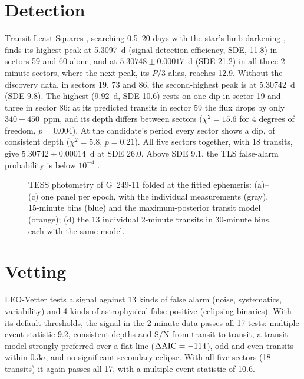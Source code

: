 \documentclass{aastex701}
\begin{document}
\section{Detection}

Transit Least Squares \citep[TLS;][]{Hippke2019tls}, searching 0.5--20 days with the
star's limb darkening \citep{Claret2017}, finds its highest peak at 5.3097~d (signal
detection efficiency, SDE, 11.8) in sectors 59 and 60 alone, and at
$5.30748\pm0.00017$~d (SDE 21.2) in all three 2-minute sectors, where the next peak, its
$P/3$ alias, reaches 12.9. Without the discovery data, in sectors 19, 73 and 86, the
second-highest peak is at 5.30742~d (SDE 9.8). The highest (9.92~d, SDE 10.6) rests on
one dip in sector 19 and three in sector 86: at its predicted transits in sector 59 the
flux drops by only $340\pm450$~ppm, and its depth differs between sectors ($\chi^2=15.6$
for 4 degrees of freedom, $p=0.004$). At the candidate's period every sector shows a dip,
of consistent depth ($\chi^2=5.8$, $p=0.21$). All five sectors together, with 18
transits, give $5.30742\pm0.00014$~d at SDE 26.0. Above SDE 9.1, the TLS false-alarm
probability is below $10^{-4}$ \citep{Hippke2019tls}.

\begin{figure}[t!]
\caption{TESS photometry of G~249-11 folded at the fitted ephemeris: (a)--(c) one panel
per epoch, with the individual measurements (gray), 15-minute bins (blue) and the
maximum-posterior transit model (orange); (d) the 13 individual 2-minute transits in
30-minute bins, each with the same model.
\label{fig:transits}}
\end{figure}

\section{Vetting}

LEO-Vetter \citep{Kunimoto2025} tests a signal against 13 kinds of false alarm (noise,
systematics, variability) and 4 kinds of astrophysical false positive (eclipsing
binaries). With its default thresholds, the signal in the 2-minute data passes all 17
tests: multiple event statistic 9.2, consistent depths and S/N from transit to transit,
a transit model strongly preferred over a flat line ($\Delta{\rm AIC}=-114$), odd and even
transits within $0.3\sigma$, and no significant secondary eclipse. With all five sectors
(18 transits) it again passes all 17, with a multiple event statistic of 10.6.
\end{document}
